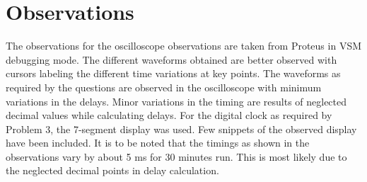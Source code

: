 \documentclass{lab_sheet}
\begin{document}
    \section{Observations}
    The observations for the oscilloscope observations are taken from Proteus in VSM debugging mode. The different waveforms obtained are better observed with cursors labeling the different time variations at key points. The waveforms as required by the questions are observed in the oscilloscope with minimum variations in the delays. Minor variations in the timing are results of neglected decimal values while calculating delays. For the digital clock as required by Problem 3, the 7-segment display was used. Few snippets of the observed display have been included. It is to be noted that the timings as shown in the observations vary by about 5 ms for 30 minutes run. This is most likely due to the neglected decimal points in delay calculation.
\end{document}
